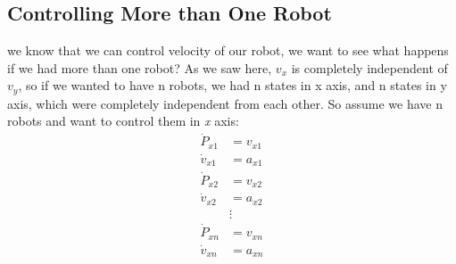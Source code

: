 \documentclass[10pt,letterpaper]{article}
\begin{document}
\subsection{Controlling More than One Robot}
we know that we can control velocity of our robot, we want to see what happens if we had more than one robot? As we saw here, $v_x$ is completely independent of $v_y$, so if we wanted to have n robots, we had n states in x axis, and n states in y axis, which were completely independent from each other. So assume we have n robots and want to control them in \emph{x} axis:\\
\begin{align}
\dot{P}_{x1} &= v_{x1}\\\nonumber
\dot{v}_{x1} &= a_{x1}\\\nonumber
\dot{P}_{x2} &= v_{x2}\\\nonumber
\dot{v}_{x2} &= a_{x2}\\\nonumber
&\vdots\\\nonumber
\dot{P}_{xn} &= v_{xn}\\\nonumber
\dot{v}_{xn} &= a_{xn}\nonumber
\end{align}
\end{document}
